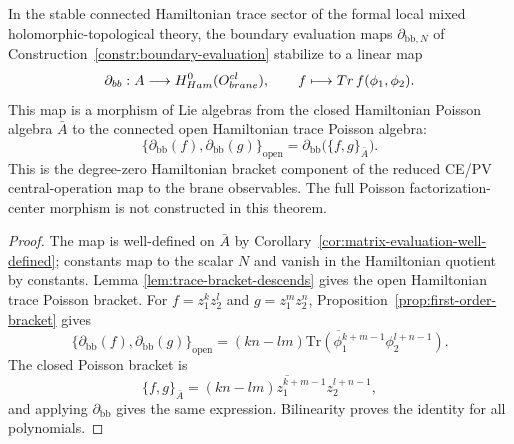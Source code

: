 \documentclass[11pt]{memoir}
\begin{document}
\begin{thm}\label{thm:bulk-boundary}
  In the stable connected Hamiltonian trace sector of the formal local mixed
  holomorphic-topological theory, the boundary evaluation maps
  $\partial_{\mathrm{bb},N}$ of Construction~\ref{constr:boundary-evaluation}
  stabilize to a linear map
  $$\partial_{bb}:A\longrightarrow
    H^0_{Ham}(O_{brane}^{cl}),\qquad
    f\longmapsto Tr\,f(\phi_1,\phi_2).$$
  This map is a morphism of Lie algebras from the closed Hamiltonian Poisson
  algebra $\bar A$ to the connected open Hamiltonian trace Poisson algebra:
  $$\{\partial_{\mathrm{bb}}(f),\partial_{\mathrm{bb}}(g)\}_{\mathrm{open}}
    =\partial_{\mathrm{bb}}\bigl(\{f,g\}_{\bar A}\bigr).$$
  This is the degree-zero Hamiltonian bracket component of the reduced
  CE/PV central-operation map to the brane observables. The
  full Poisson factorization-center morphism is not constructed in this
  theorem.
\end{thm}

\begin{proof}
  The map is well-defined on $\bar A$ by
  Corollary~\ref{cor:matrix-evaluation-well-defined}; constants map to the
  scalar $N$ and vanish in the Hamiltonian quotient by constants. Lemma
  \ref{lem:trace-bracket-descends} gives the open Hamiltonian trace Poisson
  bracket. For
  $f=z_1^kz_2^l$ and $g=z_1^mz_2^n$, Proposition~\ref{prop:first-order-bracket}
  gives
  $$\{\partial_{\mathrm{bb}}(f),\partial_{\mathrm{bb}}(g)\}_{\mathrm{open}}
    =\overline{(kn-lm)\mathrm{Tr}
      (\phi_1^{k+m-1}\phi_2^{l+n-1})}.$$
  The closed Poisson bracket is
  $$\{f,g\}_{\bar A}=\overline{(kn-lm)z_1^{k+m-1}z_2^{l+n-1}},$$
  and applying $\partial_{\mathrm{bb}}$ gives the same expression. Bilinearity
  proves the identity for all polynomials.
\end{proof}
\end{document}
